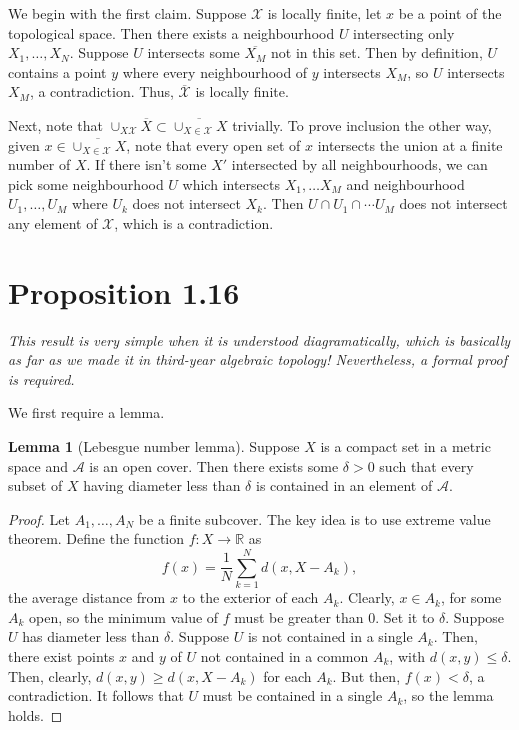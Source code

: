 \documentclass[aps,pra,showpacs,notitlepage,onecolumn,superscriptaddress,nofootinbib]{revtex4-1}
\theoremstyle{definition}
\newtheorem{lemma}{Lemma}[section]
\begin{document}
\noindent
We begin with the first claim. Suppose $\mathcal{X}$ is locally finite, let $x$ be a point of the topological space. Then there exists a neighbourhood $U$ intersecting only $X_1, \dots, X_N$. Suppose $U$ intersects
some $\overline{X_M}$ not in this set. Then by definition, $U$ contains a point $y$ where every neighbourhood of $y$ intersects $X_M$, so $U$ intersects $X_M$, a contradiction. Thus, $\overline{\mathcal{X}}$ is locally finite.

Next, note that $\cup_{X \mathcal{X}} \overline{X} \subset \overline{\cup_{X \in \mathcal{X}} X}$ trivially. To prove inclusion the other way, given $x \in \overline{\cup_{X \in \mathcal{X}} X}$, note that every open set of $x$ intersects the union at a finite number of $X$. If there isn't some $X'$ intersected by all neighbourhoods, we can pick some neighbourhood $U$ which intersects $X_1, \dots X_M$ and neighbourhood $U_1, \dots, U_M$ where $U_k$ does not intersect $X_k$. Then $U \cap U_1 \cap \cdots U_M$ does not intersect any element of $\mathcal{X}$, which is a contradiction.

\hrulefill

\section{Proposition 1.16}

\noindent
\textit{This result is very simple when it is understood diagramatically, which is basically as far as we made it in third-year algebraic topology! Nevertheless, a formal proof is required.}
\newline

\noindent
We first require a lemma.
\begin{lemma}[Lebesgue number lemma]
Suppose $X$ is a compact set in a metric space and $\mathcal{A}$ is an open cover. Then there exists some $\delta > 0$ such that every subset of $X$ having diameter less than $\delta$ is contained in an element of $\mathcal{A}$.
\end{lemma}
\begin{proof}
  Let $A_1, \dots, A_N$ be a finite subcover. The key idea is to use extreme value theorem. Define the function $f : X \rightarrow \mathbb{R}$ as
  \begin{equation}
    f(x) = \frac{1}{N} \displaystyle\sum_{k = 1}^{N} d(x, X - A_k),
    \end{equation}
  the average distance from $x$ to the exterior of each $A_k$. Clearly, $x \in A_k$, for some $A_k$ open, so the minimum value of $f$ must be greater than $0$. Set it to $\delta$. Suppose $U$ has diameter less than
  $\delta$. Suppose $U$ is not contained in a single $A_k$. Then, there exist points $x$ and $y$ of $U$ not contained in a common $A_k$, with $d(x, y) \leq \delta$. Then, clearly, $d(x, y) \geq d(x, X - A_k)$ for each $A_k$.
  But then, $f(x) < \delta$, a contradiction. It follows that $U$ must be contained in a single $A_k$, so the lemma holds.
  \end{proof}
\end{document}
